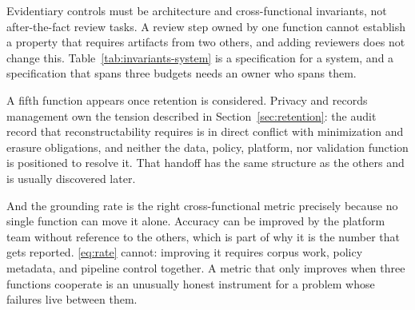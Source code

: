 Evidentiary controls must be architecture and cross-functional invariants, not
after-the-fact review tasks. A review step owned by one function cannot establish a
property that requires artifacts from two others, and adding reviewers does not
change this. Table~\ref{tab:invariants-system} is a specification for a system, and
a specification that spans three budgets needs an owner who spans them.

A fifth function appears once retention is considered. Privacy and records
management own the tension described in Section~\ref{sec:retention}: the audit record
that reconstructability requires is in direct conflict with minimization and erasure
obligations, and neither the data, policy, platform, nor validation function is
positioned to resolve it. That handoff has the same structure as the others and is
usually discovered later.

And the grounding rate is the right cross-functional metric precisely because no
single function can move it alone. Accuracy can be improved by the platform team
without reference to the others, which is part of why it is the number that gets
reported. \eqref{eq:rate} cannot: improving it requires corpus work, policy
metadata, and pipeline control together. A metric that only improves when three
functions cooperate is an unusually honest instrument for a problem whose failures
live between them.
